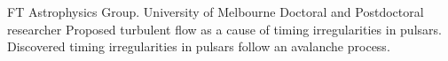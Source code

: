 \documentclass[10pt]{article} %
\begin{document}
\begin{paracol}{2}
{FT} %
{Astrophysics Group. University of Melbourne}
{Doctoral and Postdoctoral researcher}
{Proposed turbulent flow as a cause of timing irregularities in pulsars. Discovered timing irregularities in pulsars follow an avalanche process.}

\vspace{-\baselineskip}\medskip %









	
	
%	
	
	

\end{paracol}
\end{document}
